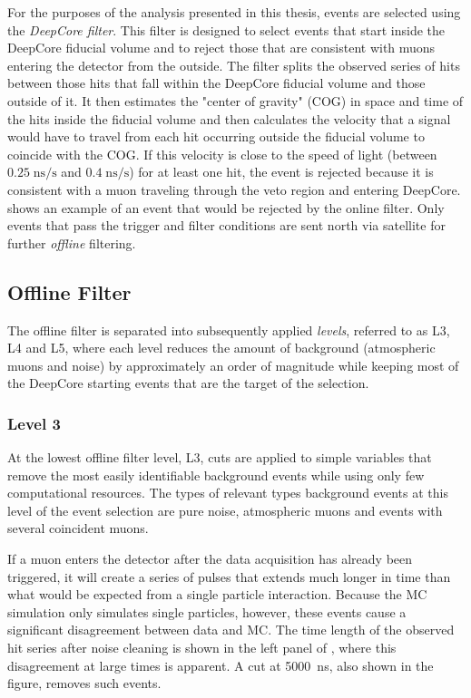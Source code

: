 For the purposes of the analysis presented in this thesis, events are selected using the \emph{DeepCore filter}.
This filter is designed to select events that start inside the DeepCore fiducial volume and to reject those that are consistent with muons entering the detector from the outside.
The filter splits the observed series of hits between those hits that fall within the DeepCore fiducial volume and those outside of it.
It then estimates the "center of gravity" (COG) in space and time of the hits inside the fiducial volume and then calculates the velocity that a signal would have to travel from each hit occurring outside the fiducial volume to coincide with the COG.
If this velocity is close to the speed of light (between $0.25\;\mathrm{ns/s}$ and $0.4\;\mathrm{ns/s}$) for at least one hit, the event is rejected because it is consistent with a muon traveling through the veto region and entering DeepCore.
 shows an example of an event that would be rejected by the online filter.
Only events that pass the trigger and filter conditions are sent north via satellite for further \emph{offline} filtering.

\subsection{Offline Filter}
\label{sec:offline-filter}
The offline filter is separated into subsequently applied \emph{levels}, referred to as L3, L4 and L5, where each level reduces the amount of background (atmospheric muons and noise) by approximately an order of magnitude while keeping most of the DeepCore starting events that are the target of the selection.

\subsubsection{Level 3}
At the lowest offline filter level, L3, cuts are applied to simple variables that remove the most easily identifiable background events while using only few computational resources.
The types of relevant types background events at this level of the event selection are pure noise, atmospheric muons and events with several coincident muons.

If a muon enters the detector after the data acquisition has already been triggered, it will create a series of pulses that extends much longer in time than what would be expected from a single particle interaction.
Because the MC simulation only simulates single particles, however, these events cause a significant disagreement between data and MC.
The time length of the observed hit series after noise cleaning is shown in the left panel of , where this disagreement at large times is apparent.
A cut at \SI{5000}{\nano\second}, also shown in the figure, removes such events.

